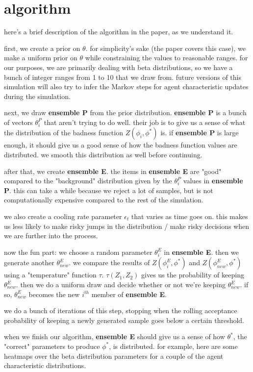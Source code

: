 \documentclass{article}
\begin{document}
\section{algorithm}
here's a brief description of the algorithm in the paper, as we understand it.

first, we create a prior on $\theta$. for simplicity's sake (the paper covers this case), we make a uniform prior on $\theta$ while constraining the values to reasonable ranges. for our purposes, we are primarily dealing with beta distributions, so we have a bunch of integer ranges from 1 to 10 that we draw from. future versions of this simulation will also try to infer the Markov steps for agent characteristic updates during the simulation.

next, we draw \textbf{ensemble P} from the prior distribution. \textbf{ensemble P} is a bunch of vectors $\theta^P_i$ that aren't trying to do well. their job is to give us a sense of what the distribution of the badness function $Z(\phi_i, \phi^*)$ is. if \textbf{ensemble P} is large enough, it should give us a good sense of how the badness function values are distributed. we smooth this distribution as well before continuing.

after that, we create \textbf{ensemble E}. the items in \textbf{ensemble E} are "good" compared to the "background" distribution given by the $\theta^P_i$ values in \textbf{ensemble P}. this can take a while because we reject a lot of samples, but is not computationally expensive compared to the rest of the simulation.

we also create a cooling rate parameter $\epsilon_t$ that varies as time goes on. this makes us less likely to make risky jumps in the distribution / make risky decisions when we are further into the process.

now the fun part: we choose a random parameter $\theta^E_i$ in \textbf{ensemble E}. then we generate another $\theta^E_{new}$. we compare the results of $Z(\phi^E_i, \phi^*)$ and $Z(\phi^E_{new}, \phi^*)$ using a "temperature" function $\tau$. $\tau(Z_1, Z_2)$ gives us the probability of keeping $\theta^E_{new}$. then we do a uniform draw and decide whether or not we're keeping $\theta^E_{new}$. if so, $\theta^E_{new}$ becomes the new $i^{th}$ member of \textbf{ensemble E}. 

we do a bunch of iterations of this step, stopping when the rolling acceptance probability of keeping a newly generated sample goes below a certain threshold. 

when we finish our algorithm, \textbf{ensemble E} should give us a sense of how $\theta^*$, the "correct" parameters to produce $\phi^*$, is distributed. for example, here are some heatmaps over the beta distribution parameters for a couple of the agent characteristic distributions. 
\end{document}
